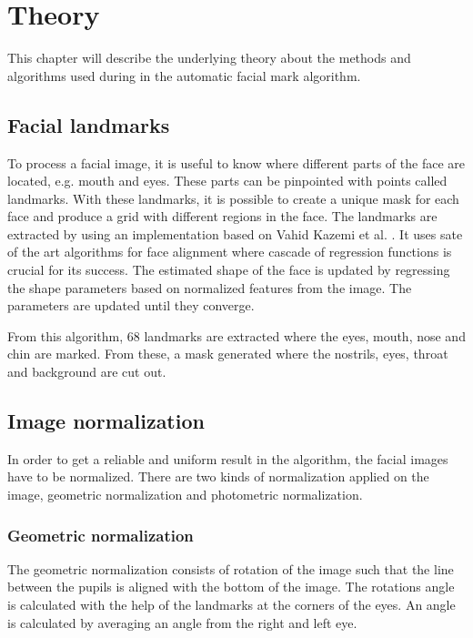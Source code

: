\chapter{Theory}\label{cha:theory}

This chapter will describe the underlying theory about the methods and algorithms used during in the automatic facial mark algorithm. 

\section{Facial landmarks} \label{sec:landmarks} 

To process a facial image, it is useful to know where different parts of the face are located, e.g. mouth and eyes. These parts can be pinpointed with points called landmarks. With these landmarks, it is possible to create a unique mask for each face and produce a grid with different regions in the face. The landmarks are extracted by using an implementation based on Vahid Kazemi et al. \cite{dlib_landmark}. It uses sate of the art algorithms for face alignment where cascade of regression functions is crucial for its success. The estimated shape of the face is updated by regressing the shape parameters based on normalized features from the image. The parameters are updated until they converge.

From this algorithm, 68 landmarks are extracted where the eyes, mouth, nose and chin are marked. From these, a mask generated where the nostrils, eyes, throat and background are cut out. 

\section{Image normalization} \label{sec:normalization} 

In order to get a reliable and uniform result in the algorithm, the facial images have to be normalized. There are two kinds of normalization applied on the image, geometric normalization and photometric normalization.  

\subsection{Geometric normalization} \label{subsec:geo_norm} 
The geometric normalization consists of rotation of the image such that the line between the pupils is aligned with the bottom of the image. The rotations angle is calculated with the help of the landmarks at the corners of the eyes. An angle is calculated by averaging an angle from the right and left eye. 

